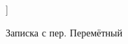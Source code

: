 \documentclass[a4paper, 12pt]{report}
\begin{document}
\begin{figure}[h!]]
	\caption{Записка с пер. Перемётный}
	\label{pic:peremetnyy}
\end{figure}
\end{document}
